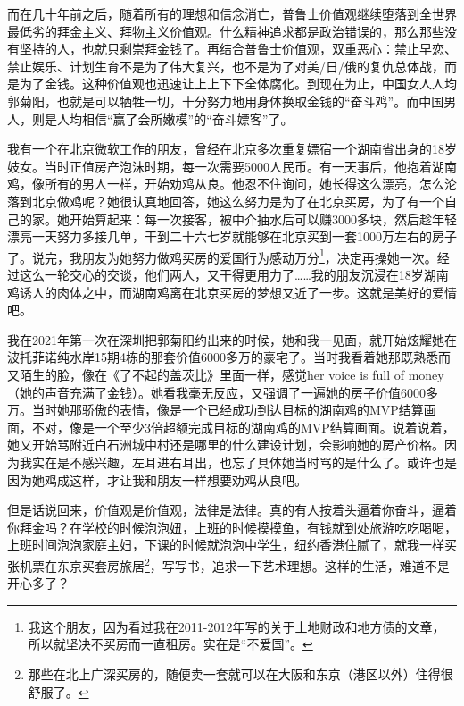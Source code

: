 而在几十年前之后，随着所有的理想和信念消亡，普鲁士价值观继续堕落到全世界最低劣的拜金主义、拜物主义价值观。什么精神追求都是政治错误的，那么那些没有坚持的人，也就只剩崇拜金钱了。再结合普鲁士价值观，双重恶心：禁止早恋、禁止娱乐、计划生育不是为了伟大复兴，也不是为了对美/日/俄的复仇总体战，而是为了金钱。这种价值观也迅速让上上下下全体腐化。到现在为止，中国女人人均郭菊阳，也就是可以牺牲一切，十分努力地用身体换取金钱的``奋斗鸡''。而中国男人，则是人均相信``赢了会所嫩模''的``奋斗嫖客''了。

我有一个在北京微软工作的朋友，曾经在北京多次重复嫖宿一个湖南省出身的18岁妓女。当时正值房产泡沫时期，每一次需要5000人民币。有一天事后，他抱着湖南鸡，像所有的男人一样，开始劝鸡从良。他忍不住询问，她长得这么漂亮，怎么沦落到北京做鸡呢？她很认真地回答，她这么努力是为了在北京买房，为了有一个自己的家。她开始算起来：每一次接客，被中介抽水后可以赚3000多块，然后趁年轻漂亮一天努力多接几单，干到二十六七岁就能够在北京买到一套1000万左右的房子了。说完，我朋友为她努力做鸡买房的爱国行为感动万分\footnote{我这个朋友，因为看过我在2011-2012年写的关于土地财政和地方债的文章，所以就坚决不买房而一直租房。实在是``不爱国''。}，决定再操她一次。经过这么一轮交心的交谈，他们两人，又干得更用力了……我的朋友沉浸在18岁湖南鸡诱人的肉体之中，而湖南鸡离在北京买房的梦想又近了一步。这就是美好的爱情吧。

我在2021年第一次在深圳把郭菊阳约出来的时候，她和我一见面，就开始炫耀她在波托菲诺纯水岸15期4栋的那套价值6000多万的豪宅了。当时我看着她那既熟悉而又陌生的脸，像在《了不起的盖茨比》里面一样，感觉her voice is full of money（她的声音充满了金钱）。她看我毫无反应，又强调了一遍她的房子价值6000多万。当时她那骄傲的表情，像是一个已经成功到达目标的湖南鸡的MVP结算画面，不对，像是一个至少3倍超额完成目标的湖南鸡的MVP结算画面。说着说着，她又开始骂附近白石洲城中村还是哪里的什么建设计划，会影响她的房产价格。因为我实在是不感兴趣，左耳进右耳出，也忘了具体她当时骂的是什么了。或许也是因为她鸡成这样，才让我和朋友一样想要劝鸡从良吧。

但是话说回来，价值观是价值观，法律是法律。真的有人按着头逼着你奋斗，逼着你拜金吗？在学校的时候泡泡妞，上班的时候摸摸鱼，有钱就到处旅游吃吃喝喝，上班时间泡泡家庭主妇，下课的时候就泡泡中学生，纽约香港住腻了，就我一样买张机票在东京买套房旅居\footnote{那些在北上广深买房的，随便卖一套就可以在大阪和东京（港区以外）住得很舒服了。}，写写书，追求一下艺术理想。这样的生活，难道不是开心多了？
